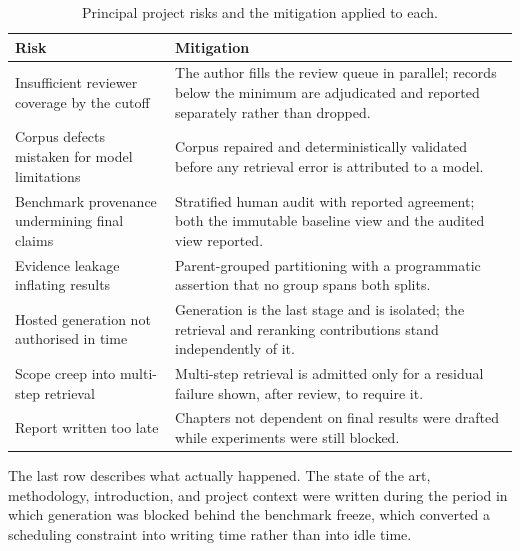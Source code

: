 \begin{table}[htbp]
  \centering
  \caption{Principal project risks and the mitigation applied to each.}
  \label{tab:context-risks}
  \small
  \begin{tabularx}{\textwidth}{@{}l X@{}}
    \toprule
    \textbf{Risk} & \textbf{Mitigation} \\
    \midrule
    Insufficient reviewer coverage by the cutoff & The author fills the review queue in parallel; records below the minimum are adjudicated and reported separately rather than dropped. \\
    Corpus defects mistaken for model limitations & Corpus repaired and deterministically validated before any retrieval error is attributed to a model. \\
    Benchmark provenance undermining final claims & Stratified human audit with reported agreement; both the immutable baseline view and the audited view reported. \\
    Evidence leakage inflating results & Parent-grouped partitioning with a programmatic assertion that no group spans both splits. \\
    Hosted generation not authorised in time & Generation is the last stage and is isolated; the retrieval and reranking contributions stand independently of it. \\
    Scope creep into multi-step retrieval & Multi-step retrieval is admitted only for a residual failure shown, after review, to require it. \\
    Report written too late & Chapters not dependent on final results were drafted while experiments were still blocked. \\
    \bottomrule
  \end{tabularx}
\end{table}

The last row describes what actually happened. The state of the art, methodology, introduction, and project context were written during the period in which generation was blocked behind the benchmark freeze, which converted a scheduling constraint into writing time rather than into idle time.
